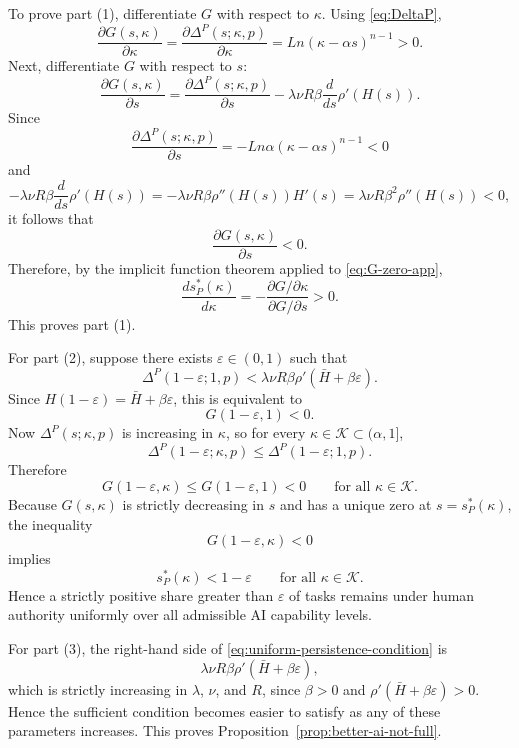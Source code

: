 To prove part (1), differentiate $G$ with respect to $\kappa$. Using \eqref{eq:DeltaP},
\[
\frac{\partial G(s,\kappa)}{\partial \kappa}
=
\frac{\partial \Delta^P(s;\kappa,p)}{\partial \kappa}
=
Ln(\kappa-\alpha s)^{n-1}>0.
\]
Next, differentiate $G$ with respect to $s$:
\[
\frac{\partial G(s,\kappa)}{\partial s}
=
\frac{\partial \Delta^P(s;\kappa,p)}{\partial s}
-\lambda \nu R \beta \frac{d}{ds}\rho'(H(s)).
\]
Since
\[
\frac{\partial \Delta^P(s;\kappa,p)}{\partial s}
=
-Ln\alpha(\kappa-\alpha s)^{n-1}<0
\]
and
\[
-\lambda \nu R \beta \frac{d}{ds}\rho'(H(s))
=
-\lambda \nu R \beta \rho''(H(s))H'(s)
=
\lambda \nu R \beta^2 \rho''(H(s))<0,
\]
it follows that
\[
\frac{\partial G(s,\kappa)}{\partial s}<0.
\]
Therefore, by the implicit function theorem applied to \eqref{eq:G-zero-app},
\[
\frac{d s_P^\ast(\kappa)}{d\kappa}
=
-
\frac{\partial G/\partial \kappa}{\partial G/\partial s}
>0.
\]
This proves part (1).

For part (2), suppose there exists $\varepsilon\in(0,1)$ such that
\[
\Delta^P(1-\varepsilon;1,p)
<
\lambda \nu R \beta \rho'(\bar H+\beta\varepsilon).
\]
Since $H(1-\varepsilon)=\bar H+\beta\varepsilon$, this is equivalent to
\[
G(1-\varepsilon,1)<0.
\]
Now $\Delta^P(s;\kappa,p)$ is increasing in $\kappa$, so for every $\kappa\in\mathcal{K}\subset(\alpha,1]$,
\[
\Delta^P(1-\varepsilon;\kappa,p)\le \Delta^P(1-\varepsilon;1,p).
\]
Therefore
\[
G(1-\varepsilon,\kappa)\le G(1-\varepsilon,1)<0
\qquad
\text{for all } \kappa\in\mathcal{K}.
\]
Because $G(s,\kappa)$ is strictly decreasing in $s$ and has a unique zero at $s=s_P^\ast(\kappa)$, the inequality
\[
G(1-\varepsilon,\kappa)<0
\]
implies
\[
s_P^\ast(\kappa)< 1-\varepsilon
\qquad
\text{for all } \kappa\in\mathcal{K}.
\]
Hence a strictly positive share greater than $\varepsilon$ of tasks remains under human authority uniformly over all admissible AI capability levels.

For part (3), the right-hand side of \eqref{eq:uniform-persistence-condition} is
\[
\lambda \nu R \beta \rho'(\bar H+\beta\varepsilon),
\]
which is strictly increasing in $\lambda$, $\nu$, and $R$, since $\beta>0$ and $\rho'(\bar H+\beta\varepsilon)>0$. Hence the sufficient condition becomes easier to satisfy as any of these parameters increases. This proves Proposition~\ref{prop:better-ai-not-full}.

